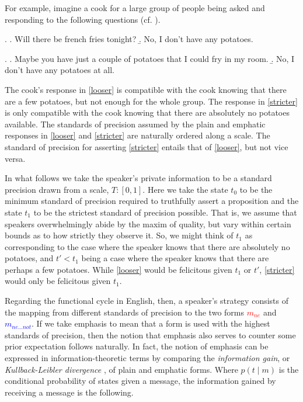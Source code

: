 \documentclass[linguex]{sp}
\theoremstyle{definition} \newtheorem{definition}{Definition}
\begin{document}
For example, imagine a cook for  a large group of people being asked and responding to  the following questions (cf. \citealt[360]{kadmon-landman1993any}).

\ex. \a. Will there be french fries tonight?
	\b.  \label{looser} No, I don't have any potatoes.

\ex.	\a. Maybe you have just a couple of potatoes that I could fry in my room.
	\b. \label{stricter} No, I don't have any potatoes at all.

The cook's response in \ref{looser} is compatible with the cook knowing that there are a few potatoes, but not enough for the whole group. The response in \ref{stricter} is only compatible with the cook knowing that there are absolutely no potatoes available. The standards of precision assumed by the plain and emphatic responses in \ref{looser} and \ref{stricter} are naturally ordered along a scale. The standard of precision for asserting \ref{stricter} entails that of \ref{looser}, but not vice versa.

In what follows we take the speaker's private information to be a standard precision drawn from a scale, $T : [0,1]$. Here we take the state  $t_0$ to be the minimum standard of precision required to truthfully assert a proposition and the state  $t_1$ to be the strictest standard of precision possible. That is, we assume that speakers overwhelmingly abide by the maxim of quality, but vary within certain bounds as to how strictly they observe  it. So, we might think of $t_1$ as corresponding to the case where the speaker knows that there are absolutely no potatoes, and $t' < t_1$ being a case where the speaker knows that there are perhaps a few potatoes.  While \ref{looser} would be felicitous given $t_1$ or $t'$, \ref{stricter} would only be felicitous given $t_1$.

Regarding the functional cycle in English, then, a speaker's strategy consists of the mapping from different standards of precision to the two forms \emph{\textcolor{red}{$m_{ne}$}} and \emph{\textcolor{blue}{$m_{ne...not}$}}. If we take emphasis to mean that a form is used with the highest standards of precision, then the notion that emphasis also serves to counter some prior expectation follows naturally. In fact, the notion of emphasis can be expressed in information-theoretic terms by comparing the  \emph{information gain}, or \emph{Kullback-Leibler divergence} \citeyearpar{kullback-leibler1951divergence}, of plain and emphatic forms. Where $p(t \mid m)$ is the conditional probability of states given a message, the information gained by receiving a message is the following.
\end{document}
